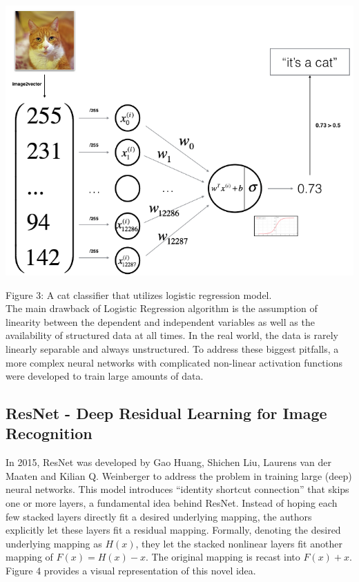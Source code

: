 \documentclass[conference]{IEEEtran}
\begin{document}
\begin{center}
    \includegraphics[scale=0.36]{LRNN.png}\\
\end{center}
Figure 3: A cat classifier that utilizes logistic regression model. \cite{7}\\

The main drawback of Logistic Regression algorithm is the assumption of linearity between the dependent and independent variables as well as the availability of structured data at all times. In the real world, the data is rarely linearly separable and always unstructured. To address these biggest pitfalls, a more complex neural networks with complicated non-linear activation functions were developed to train large amounts of data.

\subsection{\textbf{ResNet - Deep Residual Learning for Image Recognition}}
In 2015, ResNet was developed by Gao Huang, Shichen Liu, Laurens van der Maaten and Kilian Q. Weinberger to address the problem in training large (deep) neural networks. This model introduces “identity shortcut connection” that skips one or more layers, a fundamental idea behind ResNet. Instead of hoping each few stacked layers directly fit a desired underlying mapping, the authors explicitly let these layers fit a residual mapping. Formally, denoting the desired underlying mapping as $H(x)$, they let the stacked nonlinear layers fit another mapping of ${F(x) = H(x)−x}$. The original mapping is recast into $F(x)+x$. Figure 4 provides a visual representation of this novel idea.
\end{document}
